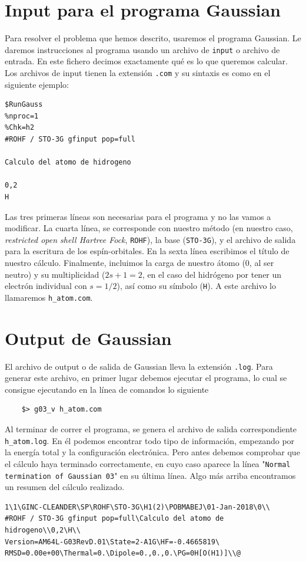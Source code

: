\documentclass{tufte-book}
\begin{document}
\section{Input para el programa Gaussian}
Para resolver el problema que hemos descrito, usaremos
el programa Gaussian. Le daremos instrucciones al programa
usando un archivo de \texttt{input} o archivo de entrada.
En este fichero decimos exactamente qué es lo que queremos
calcular. Los archivos de input tienen la extensión 
\texttt{.com} y su sintaxis es como en el siguiente ejemplo:

\begin{verbatim}
$RunGauss
%nproc=1
%Chk=h2
#ROHF / STO-3G gfinput pop=full

Calculo del atomo de hidrogeno 
 
0,2
H
\end{verbatim}

Las tres primeras líneas son necesarias para el programa y 
no las vamos a modificar. La cuarta línea, se corresponde 
con nuestro método (en nuestro caso, \textit{restricted open 
shell Hartree Fock}, \texttt{ROHF}), la base (\texttt{STO-3G}),
y el archivo de salida para la escritura de los espín-orbitales.
En la sexta línea escribimos el título de nuestro cálculo.
Finalmente, incluimos la carga de nuestro átomo (0, al ser 
neutro) y su multiplicidad ($2s+1=2$, en el caso del hidrógeno
por tener un electrón individual con $s=1/2$), así como su símbolo
(\texttt{H}). A este archivo lo llamaremos \texttt{h\_atom.com}.


\section{Output de Gaussian}
El archivo de output o de salida de Gaussian lleva la extensión
\texttt{.log}. Para generar este archivo, en primer lugar debemos
ejecutar el programa, lo cual se consigue ejecutando en la línea
de comandos lo siguiente
\begin{verbatim}
    $> g03_v h_atom.com
\end{verbatim}
Al terminar de correr el programa, se genera el archivo de salida
correspondiente \texttt{h\_atom.log}. En él podemos encontrar todo
tipo de información, empezando por la energía total y la 
configuración electrónica. Pero antes debemos comprobar que
el cálculo haya terminado correctamente, en cuyo caso aparece la 
línea "\texttt{Normal termination of Gaussian 03}" en su 
última línea. Algo más arriba encontramos un resumen del
cálculo realizado.
\begin{small}
\begin{verbatim}
1\1\GINC-CLEANDER\SP\ROHF\STO-3G\H1(2)\POBMABEJ\01-Jan-2018\0\\
#ROHF / STO-3G gfinput pop=full\Calculo del atomo de hidrogeno\\0,2\H\\
Version=AM64L-G03RevD.01\State=2-A1G\HF=-0.4665819\
RMSD=0.00e+00\Thermal=0.\Dipole=0.,0.,0.\PG=0H[O(H1)]\\@
\end{verbatim}
\end{small}
\end{document}
